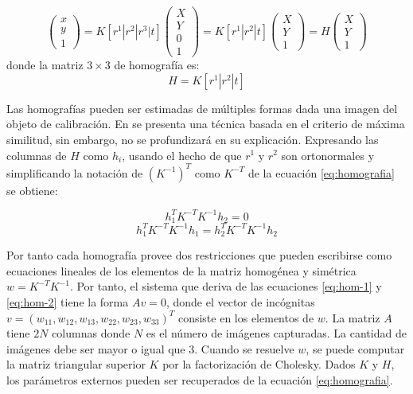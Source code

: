 \begin{enumerate}
	\begin{equation}
		\begin{pmatrix}
			x\\
			y\\
			1
		\end{pmatrix} = K[r^1|r^2|r^3|t] \begin{pmatrix}
			X\\
			Y\\
			0\\
			1
		\end{pmatrix}
		= K[r^1|r^2|t]
		\begin{pmatrix}
			X\\
			Y\\
			1
		\end{pmatrix}
		= H\begin{pmatrix}
			X\\
			Y\\
			1
		\end{pmatrix}
	\end{equation}
	donde la matriz $3 \times 3$ de homografía es:
	\begin{equation}\label{eq:homografia}
		H = K[r^1|r^2|t]
	\end{equation}
	
	Las homografías pueden ser estimadas de múltiples formas dada una imagen del objeto de calibración. En \cite{zhang2000flexible} se presenta una técnica basada en el criterio de máxima similitud, sin embargo, no se profundizará en su explicación. Expresando las columnas de $H$ como $h_i$, usando el hecho de que $r^1$ y $r^2$ son ortonormales y simplificando la notación de $(K^{-1})^T$ como $K^{-T}$ de la ecuación \ref{eq:homografia} se obtiene:
	
	\begin{equation}\label{eq:hom-1}
		h_1^TK^{-T}K^{-1}h_2 = 0
	\end{equation}
	\begin{equation}\label{eq:hom-2}
		h_1^TK^{-T}K^{-1}h_1 = h_2^TK^{-T}K^{-1}h_2
	\end{equation}
	
	Por tanto cada homografía provee dos restricciones que pueden escribirse como ecuaciones lineales de los elementos de la matriz homogénea y simétrica $w = K^{-T}K^{-1}$. Por tanto, el sistema que deriva de las ecuaciones \ref{eq:hom-1} y \ref{eq:hom-2} tiene la forma $Av = 0$, donde el vector de incógnitas $v = (w_{11}, w_{12}, w_{13}, w_{22}, w_{23}, w_{33})^T$ consiste en los elementos de $w$. La matriz $A$ tiene $2N$ columnas donde $N$ es el número de imágenes capturadas. La cantidad de imágenes debe ser mayor o igual que 3. Cuando se resuelve $w$, se puede computar la matriz triangular superior $K$ por la factorización de Cholesky. Dados $K$ y $H$, los parámetros externos pueden ser recuperados de la ecuación \ref{eq:homografia}.
	

\end{enumerate}
